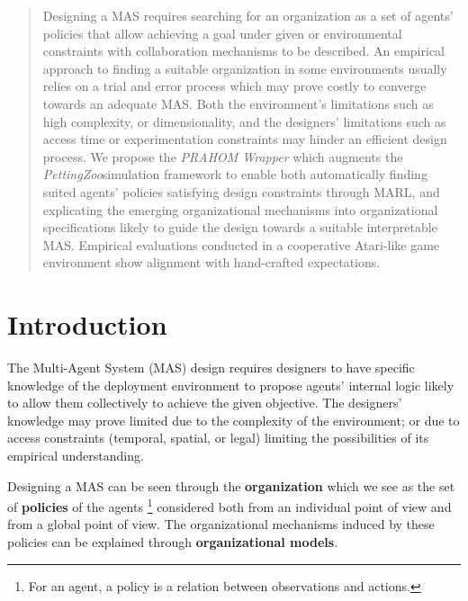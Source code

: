 \documentclass[doubleblind]{ecai}
\newcounter{relation}
\begin{document}
\begin{frontmatter}
    \begin{abstract}
        Designing a MAS requires searching for an organization as a set of agents' policies that allow achieving a goal under given or environmental constraints with collaboration mechanisms to be described.
        An empirical approach to finding a suitable organization in some environments usually relies on a trial and error process which may prove costly to converge towards an adequate MAS. Both the environment's limitations such as high complexity, or dimensionality, and the designers' limitations such as access time or experimentation constraints may hinder an efficient design process.
        We propose the \emph{PRAHOM Wrapper} which augments the \emph{PettingZoo}simulation framework to enable both automatically finding suited agents' policies satisfying design constraints through MARL, and explicating the emerging organizational mechanisms into organizational specifications likely to guide the design towards a suitable interpretable MAS.
        Empirical evaluations conducted in a cooperative Atari-like game environment show alignment with hand-crafted expectations.
        
    \end{abstract}

\end{frontmatter}


\section{Introduction}

The Multi-Agent System (MAS) design requires designers to have specific knowledge of the deployment environment to propose agents' internal logic likely to allow them collectively to achieve the given objective.
%
The designers' knowledge may prove limited due to the complexity of the environment; or due to access constraints (temporal, spatial, or legal) limiting the possibilities of its empirical understanding.

Designing a MAS can be seen through the \textbf{organization} which we see as the set of \textbf{policies} of the agents
\footnote{For an agent, a policy is a relation between observations and actions.}
considered both from an individual point of view and from a global point of view. The organizational mechanisms induced by these policies can be explained through \textbf{organizational models}.
\end{document}
